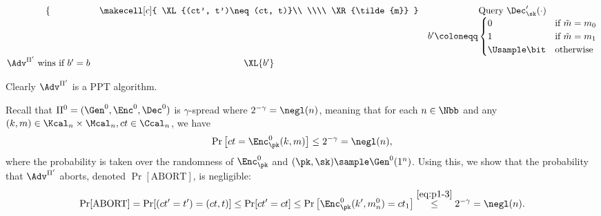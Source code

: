 \begin{answer}
{\[\begin{array}{@{} c c c @{}}
{{\begin{cases}
                    \end{cases}}
                } & \makecell[c]{
                    \XL{(ct', t')\neq (ct, t)}\\
                    \\\\
                    \XR{\tilde{m}}
                } & \textrm{Query } \Dec'_\sk(\cdot)\\
                && b'\coloneqq \begin{cases}
                    0 & \textrm{if } \tilde{m} = m_0\\
                    1 & \textrm{if } \tilde{m} = m_1\\
                    \Usample \bit & \textrm{otherwise} 
                \end{cases}\\
                \textrm{$\Adv^{\Pi'}$ wins if $b'=b$} & \XL{b'} & \\
                \end{array}
            \]
            \label{fig:p1-game3}
        }

        Clearly $\Adv^{\Pi'}$ is a PPT algorithm.
        
        Recall that $\Pi^0=(\Gen^0, \Enc^0,\Dec^0)$ is $\gamma$-spread where $2^{-\gamma}=\negl(n)$, meaning that for each $n\in\Nbb$ and any $(k,m)\in \Kcal_n \times \Mcal_n, ct\in\Ccal_n$, we have
        \begin{equation}\label{eq:p1-3}
            \Pr\left[ct=\Enc^0_\pk(k,m)\right] \le 2^{-\gamma} = \negl(n),
        \end{equation}
        where the probability is taken over the randomness of $\Enc^0_\pk$ and $(\pk, \sk)\sample \Gen^0(1^n)$. Using this, we show that the probability that $\Adv^{\Pi'}$ aborts, denoted $\Pr[\textrm{ABORT}]$, is negligible:
        \begin{equation}\label{eq:p1-5}
            \Pr[\textrm{ABORT}]
            = \Pr[(ct'=t')=(ct,t)]
            \le \Pr[ct'=ct]
            \le \Pr\left[\Enc^0_\pk(k', m^0_n)=ct_1\right]
            \stackrel{\eqref{eq:p1-3}}\le 2^{-\gamma}
            =\negl(n).
        \end{equation}


\end{answer}
